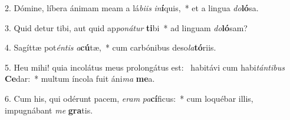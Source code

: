 2. Dómine, líbera ánimam meam a lá\textit{bi}\textit{is} \textit{in}\textbf{í}quis,~*  et a lingua \textit{do}\textbf{ló}sa.\

3. Quid detur tibi, aut quid ap\textit{po}\textit{ná}\textit{tur} \textbf{ti}bi~*  ad linguam \textit{do}\textbf{ló}sam?\

4. Sagíttæ pot\textit{én}\textit{tis} \textit{a}\textbf{cú}tæ,~*  cum carbónibus deso\textit{la}\textbf{tó}riis.\

5. Heu mihi! quia incolátus meus prolongátus est: \dag\  habitávi cum habi\textit{tán}\textit{ti}\textit{bus} \textbf{Ce}dar:~*  multum íncola fuit áni\textit{ma} \textbf{me}a.\

6. Cum his, qui odérunt pacem, \textit{e}\textit{ram} \textit{pa}\textbf{cí}ficus:~*  cum loquébar illis, impugnábant \textit{me} \textbf{gra}tis.\

